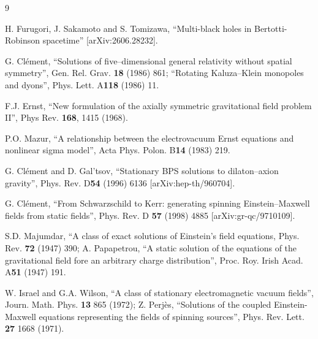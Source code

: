 \documentclass[11pt]{article}
\def\bb{\bibitem}
\begin{document}
\begin{thebibliography}{9}

\bb{furugori} H. Furugori, J. Sakamoto and S. Tomizawa, ``Multi-black holes in Bertotti-Robinson spacetime'' [arXiv:2606.28232].

\bb{spat} G. Cl\'ement, ``Solutions of five--dimensional general relativity without spatial symmetry'', Gen. Rel. Grav. {\bf 18} (1986)
861; ``Rotating Kaluza--Klein monopoles and dyons'', Phys.  Lett. A{\bf 118} (1986) 11.

 F.J. Ernst, ``New formulation of the axially symmetric gravitational field problem II'', Phys  Rev. {\bf 168}, 1415 (1968).

 P.O. Mazur, ``A relationship between the electrovacuum Ernst equations and nonlinear sigma model'', Acta Phys. Polon. B{\bf 14} (1983) 219.

\bb{bps} G. Cl\'ement and D. Gal'tsov, ``Stationary BPS solutions to dilaton--axion gravity'', Phys. Rev. D{\bf 54} (1996) 6136 [arXiv:hep-th/960704].

\bb{kerr} G. Cl\'ement, ``From Schwarzschild to Kerr: generating spinning Einstein--Maxwell fields from static fields'', Phys. Rev. D {\bf 57} (1998) 4885 [arXiv:gr-qc/9710109].

\bb{mp} S.D. Majumdar, ``A class of exact solutions of Einstein's field equations, Phys. Rev. {\bf 72} (1947) 390; A. Papapetrou, ``A static solution of the equations of the gravitational field fore an arbitrary charge distribution'', Proc. Roy. Irish Acad. A{\bf 51} (1947) 191.

\bb{iwp} W. Israel and G.A. Wilson, ``A class of stationary electromagnetic vacuum fields'', Journ. Math. Phys. {\bf 13} 865 (1972); Z. Perj\`es, ``Solutions of the coupled Einstein-Maxwell equations representing the fields of spinning sources'', Phys. Rev. Lett. {\bf 27} 1668 (1971).

\end{thebibliography}
\end{document}
